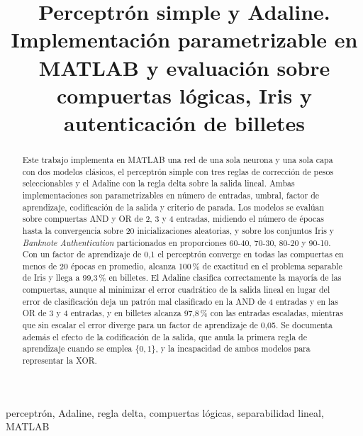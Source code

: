 \documentclass[conference]{IEEEtran}
\begin{document}
\title{Perceptr\'on simple y Adaline. Implementaci\'on parametrizable en MATLAB y evaluaci\'on sobre compuertas l\'ogicas, Iris y autenticaci\'on de billetes}

\author{
}

\maketitle

\begin{abstract}
Este trabajo implementa en MATLAB una red de una sola neurona y una sola capa con dos modelos cl\'asicos, el perceptr\'on simple con tres reglas de correcci\'on de pesos seleccionables y el Adaline con la regla delta sobre la salida lineal. Ambas implementaciones son parametrizables en n\'umero de entradas, umbral, factor de aprendizaje, codificaci\'on de la salida y criterio de parada. Los modelos se eval\'uan sobre compuertas AND y OR de 2, 3 y 4 entradas, midiendo el n\'umero de \'epocas hasta la convergencia sobre 20 inicializaciones aleatorias, y sobre los conjuntos Iris y \textit{Banknote Authentication} particionados en proporciones 60-40, 70-30, 80-20 y 90-10. Con un factor de aprendizaje de 0,1 el perceptr\'on converge en todas las compuertas en menos de 20 \'epocas en promedio, alcanza 100\,\% de exactitud en el problema separable de Iris y llega a 99,3\,\% en billetes. El Adaline clasifica correctamente la mayor\'ia de las compuertas, aunque al minimizar el error cuadr\'atico de la salida lineal en lugar del error de clasificaci\'on deja un patr\'on mal clasificado en la AND de 4 entradas y en las OR de 3 y 4 entradas, y en billetes alcanza 97,8\,\% con las entradas escaladas, mientras que sin escalar el error diverge para un factor de aprendizaje de 0,05. Se documenta adem\'as el efecto de la codificaci\'on de la salida, que anula la primera regla de aprendizaje cuando se emplea $\{0,1\}$, y la incapacidad de ambos modelos para representar la XOR.
\end{abstract}

\begin{IEEEkeywords}
perceptr\'on, Adaline, regla delta, compuertas l\'ogicas, separabilidad lineal, MATLAB
\end{IEEEkeywords}
\end{document}

